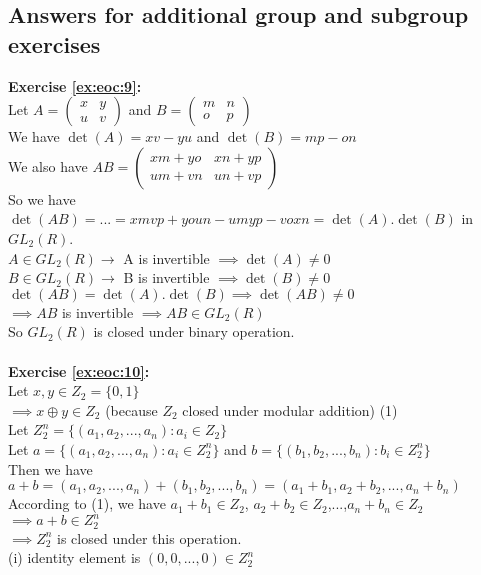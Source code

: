 \subsection{Answers for additional group and subgroup exercises}
\textbf{Exercise \ref{ex:eoc:9}:}\\
Let $A=\begin{pmatrix}
x & y\\
u & v
\end{pmatrix}$ and $B=\begin{pmatrix}
m & n\\
o & p
\end{pmatrix}$\\
We have $\det(A)=xv-yu$ and $\det(B)=mp-on$\\
We also have $AB=\begin{pmatrix}
xm+yo & xn+yp\\
um+vn & un+vp
\end{pmatrix}$\\
So we have $\det(AB)=...=xmvp+youn-umyp-voxn=\det(A).\det(B)$ in $GL_2(R)$.\\
$A\in GL_2(R) \to$ A is invertible $\implies \det(A)\neq 0$\\
$B\in GL_2(R) \to$ B is invertible $\implies \det(B)\neq 0$\\
$\det(AB)=\det(A).\det(B)\implies \det(AB)\neq 0$\\
$\implies AB$ is invertible $\implies AB\in GL_2(R)$\\
So $GL_2(R)$ is closed under binary operation.\\
\\
\textbf{Exercise \ref{ex:eoc:10}:}\\
Let $x,y\in Z_2=\{0,1\}$\\
$\implies x\oplus y\in Z_2$ (because $Z_2$ closed under modular addition) (1)\\
Let $Z_2^n=\{(a_1,a_2,...,a_n):a_i\in Z_2\}$\\
Let $a=\{(a_1,a_2,...,a_n):a_i\in Z_2^n\}$ and $b=\{(b_1,b_2,...,b_n):b_i\in Z_2^n\}$\\
Then we have $a+b=(a_1,a_2,...,a_n)+(b_1,b_2,...,b_n)=(a_1+b_1,a_2+b_2,...,a_n+b_n)$\\
According to (1), we have $a_1+b_1\in Z_2$, $a_2+b_2\in Z_2$,...,$a_n+b_n\in Z_2$\\
$\implies a+b\in Z_2^n$\\
$\implies Z_2^n$ is closed under this operation.\\
(i) identity element is $(0,0,...,0)\in Z_2^n$\\
